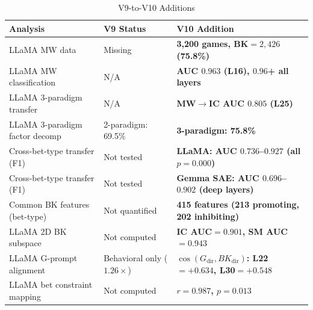 \documentclass[11pt,a4paper]{article}
\begin{document}
\begin{table}[H]
\centering
\caption{V9-to-V10 Additions}\label{tab:a1}
\footnotesize
\begin{tabular}{lp{4cm}p{6cm}}
\toprule
Analysis & V9 Status & V10 Addition \\
\midrule
LLaMA MW data & Missing & \textbf{3,200 games, BK$=2{,}426$ (75.8\%)} \\
LLaMA MW classification & N/A & \textbf{AUC $0.963$ (L16), $0.96$+ all layers} \\
LLaMA 3-paradigm transfer & N/A & \textbf{MW$\rightarrow$IC AUC $0.805$ (L25)} \\
LLaMA 3-paradigm factor decomp & 2-paradigm: 69.5\% & \textbf{3-paradigm: 75.8\%} \\
Cross-bet-type transfer (F1) & Not tested & \textbf{LLaMA: AUC $0.736$--$0.927$ (all $p=0.000$)} \\
Cross-bet-type transfer (F1) & Not tested & \textbf{Gemma SAE: AUC $0.696$--$0.902$ (deep layers)} \\
Common BK features (bet-type) & Not quantified & \textbf{415 features (213 promoting, 202 inhibiting)} \\
LLaMA 2D BK subspace & Not computed & \textbf{IC AUC$=0.901$, SM AUC$=0.943$} \\
LLaMA G-prompt alignment & Behavioral only ($1.26\times$) & \textbf{$\cos(G_\mathrm{dir}, BK_\mathrm{dir})$: L22$=+0.634$, L30$=+0.548$} \\
LLaMA bet constraint mapping & Not computed & \textbf{$r=0.987$, $p=0.013$} \\
\bottomrule
\end{tabular}
\end{table}
\end{document}
